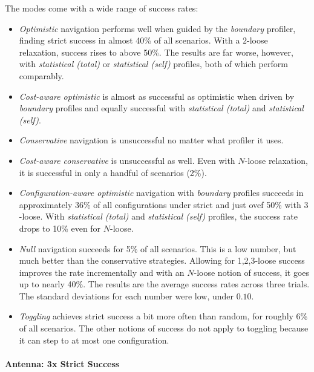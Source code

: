 The modes come with a wide range of success rates: 
\begin{itemize}
  \item
    \emph{Optimistic} navigation performs well when guided by the \emph{boundary} profiler,
    finding strict success in almost 40\% of all scenarios. 
    With a $2$-loose relaxation, success rises to above 50\%.
    The results are far worse, however, with \emph{statistical (total)} or \emph{statistical (self)}
    profiles, both of which perform comparably.

  \item
    \emph{Cost-aware optimistic} is almost as successful as optimistic when driven
    by \emph{boundary} profiles and equally successful with \emph{statistical (total)}
    and \emph{statistical (self)}.

  \item
    \emph{Conservative} navigation is unsuccessful no matter what profiler it uses.

  \item
    \emph{Cost-aware conservative} is unsuccessful as well.
    Even with $N$-loose relaxation, it is successful in only a handful of scenarios (2\%).

  \item
    \emph{Configuration-aware optimistic} navigation with
    \emph{boundary} profiles succeeds in approximately 36\% of all
    configurations under strict and just ovef 50\% with $3$-loose.
    With \emph{statistical (total)} and \emph{statistical (self)} profiles,
    the success rate drops to 10\% even for $N$-loose.

  \item
    \emph{Null} navigation succeeds for 5\% of all scenarios.
    This is a low number, but much better than the conservative strategies.
    Allowing for 1,2,3-loose success improves the rate incrementally and with an
    $N$-loose notion of success, it goes up to nearly 40\%.
  \subitem
    The results are the average success rates across three trials. The standard deviations
    for each number were low, under $0.10$.

  \item
    \emph{Toggling} achieves strict success a bit more often than random, for
    roughly 6\% of all scenarios.
    The other notions of success do not apply to toggling because it can step to at most one configuration.
\end{itemize}

\paragraph{Antenna: 3x Strict Success} \label{s:antenna}

